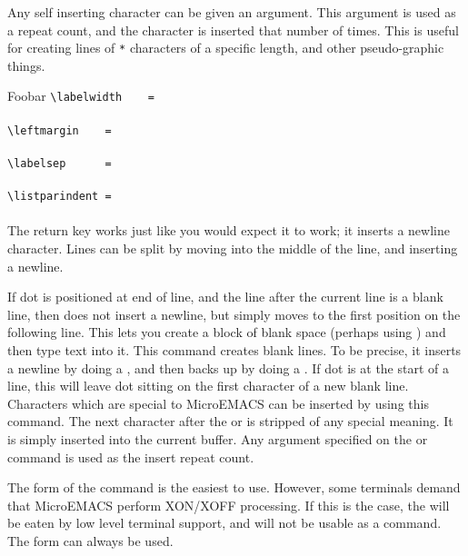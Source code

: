 Any self inserting character can be given an argument. This argument is
used as a repeat count, and the character is inserted that number of
times. This is useful for creating lines of \verb+*+ characters of a specific
length, and other pseudo-graphic things.
\begin{cmdlist}
 \item[Foobar]
 \verb+\labelwidth    = + \\
	\framebox[\labelwidth]{*}	\\
 \verb+\leftmargin    = + \\
	\framebox[\leftmargin]{*}	\\
 \verb+\labelsep      = + \\
	\framebox[\labelsep]{*}	\\
 \verb+\listparindent = + \\
	\framebox[\listparindent]{*}	\\

The return key works just like you would expect it to work;
it inserts a newline character. Lines can be split by moving into the middle
of the line, and inserting a newline.

If dot is positioned at end of line,
and the line after the current line is a blank line,
then  does not insert a newline,
but simply moves to the first position
on the following line. This lets you create a block of blank space (perhaps
using ) and then type text into it.
This command creates blank lines. To be precise, it inserts
a newline by doing a ,
and then backs up by doing a . If dot is at
the start of a line, this will leave dot sitting on the first character
of a new blank line.
Characters which are special to MicroEMACS can be inserted by
using this command.
The next character after the  or  is stripped of
any special meaning. It is simply inserted into the current buffer.
Any argument specified on the 
or  command is used as the insert
repeat count.

The form of the command is the easiest to use. However, some terminals
demand that MicroEMACS perform XON/XOFF processing. If this is the case,
the  will be eaten by low level terminal support,
and will not be usable
as a command. The  form can always be used.
\end{cmdlist}
